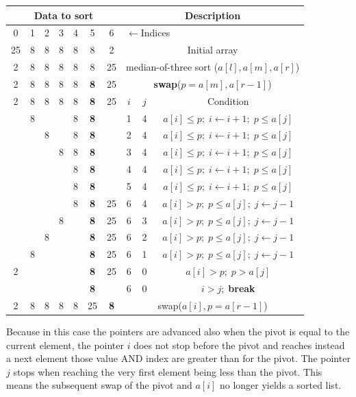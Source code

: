 \begin{center}
\begin{tabular}{|c|c|c|c|c|c|c|c|c|c|}
\hline
\multicolumn{7}{|c|}{\textbf{Data to sort}}& \multicolumn{3}{|c|}{\textbf{Description}}\\
\hline
0& 1& 2& 3& 4& 5& 6& \multicolumn{3}{|l|}{ \(\leftarrow\)Indices} \\
\hline
25& 8& 8& 8& 8& 8& 2& \multicolumn{3}{|c|}{Initial array} \\
\hline
2& 8& 8& 8& 8& 8& 25& \multicolumn{3}{|c|}{median-of-three sort (\( a[l],a[m],a[r] \))} \\
\hline
2& 8& 8& 8& 8& \textbf{8} & 25& \multicolumn{3}{|c|}{ \textbf{swap}(\( p=a[m],a[r-1] \))} \\
\hline
2& 8& 8& 8& 8& \textbf{8} & 25& \(i\)& \(j\)& Condition \\
\hline
& 8& & & 8& \textbf{8}& & 1& 4& \(a[i] \leq p;\; i \leftarrow i+1;\; p \leq a[j]\) \\
\hline
& & 8& & 8& \textbf{8}& & 2& 4& \(a[i] \leq p;\; i \leftarrow i+1;\; p \leq a[j]\) \\
\hline
& & & 8& 8& \textbf{8}& & 3& 4& \(a[i] \leq p;\; i \leftarrow i+1;\; p \leq a[j]\) \\
\hline
& & & & 8& \textbf{8}& & 4& 4& \(a[i] \leq p;\; i \leftarrow i+1;\; p \leq a[j]\) \\
\hline
& & & & 8& \textbf{8}& & 5& 4& \(a[i] \leq p;\; i \leftarrow i+1;\; p \leq a[j]\) \\
\hline
& & & & 8& \textbf{8}& 25& 6& 4& \(a[i] > p;\; p \leq a[j];\; j\leftarrow j-1\) \\
\hline
& & & 8& & \textbf{8}& 25& 6& 3& \(a[i] > p;\; p \leq a[j];\; j\leftarrow j-1\) \\
\hline
& & 8& & & \textbf{8}& 25& 6& 2& \(a[i] > p;\; p \leq a[j];\; j\leftarrow j-1\) \\
\hline
& 8& & & & \textbf{8}& 25& 6& 1& \(a[i] > p;\; p \leq a[j];\; j\leftarrow j-1\) \\
\hline
2& & & & & \textbf{8}& 25& 6& 0& \(a[i] > p;\; p > a[j]\) \\
\hline
& & & & & \textbf{8}& & 6& 0& \(i >j;\;\)\textbf{break} \\
\hline
2& 8& 8& 8& 8& 25& \textbf{8}& \multicolumn{3}{|c|}{swap(\(a[i],p=a[r-1]\))} \\
\hline
\end{tabular}
\end{center}
Because in this case the pointers are advanced also when the pivot is equal to 
the current element, the pointer
\(i\) does not stop before the pivot and 
reaches instead a next element those value AND index are greater than 
for the pivot. The pointer \(j\) stops when reaching the very first
element being less than the pivot. This means the subsequent swap of the pivot and 
\(a[i]\) 
no longer yields a sorted list. 
\fi

